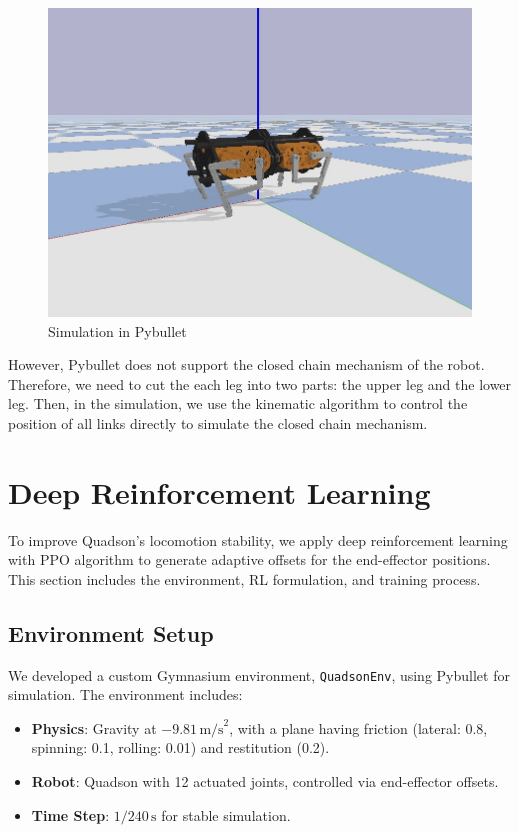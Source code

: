 \documentclass[a4paper,11pt]{article}
\begin{document}
\begin{figure}[H]
  \centering
	\includegraphics[width=0.6\linewidth]{../../assets/pybullet.jpg}
  \caption{Simulation in Pybullet}
  \label{fig:bullet}
\end{figure}

However, Pybullet does not support the closed chain mechanism of the robot. Therefore, we need to 
cut the each leg into two parts: the upper leg and the lower leg. Then, in the simulation, 
we use the kinematic algorithm to control the position of all links directly to simulate the
closed chain mechanism.

\section{Deep Reinforcement Learning}

To improve Quadson's locomotion stability, we apply deep reinforcement learning with PPO algorithm to generate adaptive offsets for the end-effector positions. This section includes the environment, RL formulation, and training process.

\subsection{Environment Setup}

We developed a custom Gymnasium environment, \texttt{QuadsonEnv}, using Pybullet for simulation. The environment includes:
\begin{itemize}
    \item \textbf{Physics}: Gravity at \(-9.81 \, \text{m/s}^2\), with a plane having friction (lateral: 0.8, spinning: 0.1, rolling: 0.01) and restitution (0.2).
    \item \textbf{Robot}: Quadson with 12 actuated joints, controlled via end-effector offsets.
    \item \textbf{Time Step}: \(1/240 \, \text{s}\) for stable simulation.
\end{itemize}
\end{document}
